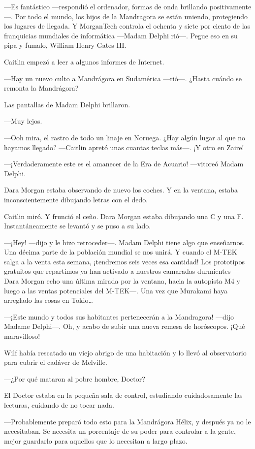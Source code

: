 ---Es fantástico ---respondió el ordenador, formas de onda brillando
positivamente---. Por todo el mundo, los hijos de la Mandragora se están
uniendo, protegiendo los lugares de llegada. Y MorganTech controla el
ochenta y siete por ciento de las franquicias mundiales de informática
---Madam Delphi rió---. Pegue eso en su pipa y fumalo, William Henry
Gates III.

Caitlin empezó a leer a algunos informes de Internet.

---Hay un nuevo culto a Mandrágora en Sudamérica ---rió---. ¿Hasta
cuándo se remonta la Mandrágora?

Las pantallas de Madam Delphi brillaron.

---Muy lejos.

---Ooh mira, el rastro de todo un linaje en Noruega. ¿Hay algún lugar al
que no hayamos llegado? ---Caitlin apretó unas cuantas teclas más---. ¡Y
otro en Zaire!

---¡Verdaderamente este es el amanecer de la Era de Acuario! ---vitoreó
Madam Delphi.

Dara Morgan estaba observando de nuevo los coches. Y en la ventana,
estaba inconscientemente dibujando letras con el dedo.

Caitlin miró. Y frunció el ceño. Dara Morgan estaba dibujando una C y
una F. Instantáneamente se levantó y se puso a su lado.

---¡Hey! ---dijo y le hizo retroceder---. Madam Delphi tiene algo que
enseñarnos. Una décima parte de la población mundial se nos unirá. Y
cuando el M-TEK salga a la venta esta semana, ¡tendremos seis veces esa
cantidad! Los prototipos gratuitos que repartimos ya han activado a
nuestros camaradas durmientes ---Dara Morgan echo una última mirada por
la ventana, hacia la autopista M4 y luego a las ventas potenciales del
M-TEK---. Una vez que Murakami haya arreglado las cosas en Tokio\ldots{}

---¡Este mundo y todos sus habitantes pertenecerán a la Mandragora!
---dijo Madame Delphi---. Oh, y acabo de subir una nueva remesa de
horóscopos. ¡Qué maravilloso!

Wilf había rescatado un viejo abrigo de una habitación y lo llevó al
observatorio para cubrir el cadáver de Melville.

---¿Por qué mataron al pobre hombre, Doctor?

El Doctor estaba en la pequeña sala de control, estudiando
cuidadosamente las lecturas, cuidando de no tocar nada.

---Probablemente preparó todo esto para la Mandrágora Hélix, y después
ya no le necesitaban. Se necesita un porcentaje de su poder para
controlar a la gente, mejor guardarlo para aquellos que lo necesitan a
largo plazo.


